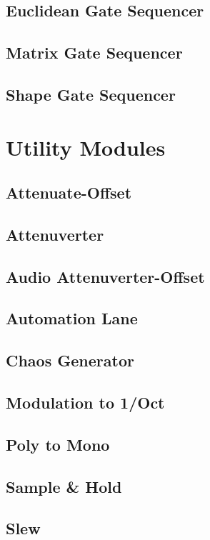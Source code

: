 \documentclass[11pt]{book}
\begin{document}
\pagebreak



\section{Euclidean Gate Sequencer}
\pagebreak
\section{Matrix Gate Sequencer}
\pagebreak
\section{Shape Gate Sequencer}
\pagebreak

\chapter{Utility Modules}
\pagebreak
\section{Attenuate-Offset}
\pagebreak
\section{Attenuverter}
\pagebreak
\section{Audio Attenuverter-Offset}
\pagebreak
\section{Automation Lane}
\pagebreak
\section{Chaos Generator}
\pagebreak
\section{Modulation to 1/Oct}
\pagebreak
\section{Poly to Mono}
\pagebreak
\section{Sample \& Hold}
\pagebreak
\section{Slew}
\pagebreak
\end{document}
